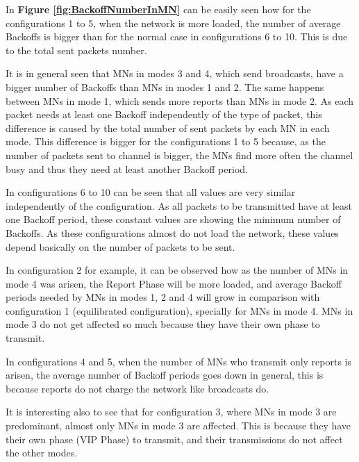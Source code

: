 In \textbf{Figure \ref{fig:BackoffNumberInMN}} can be easily seen how for the configurations 1 to 5, when the network is more loaded, the number of 
average Backoffs is bigger than for the normal case in configurations 6 to 10. This is due to the total sent packets number.

It is in general seen that \acp{MN} in modes 3 and 4, which send broadcasts, have a bigger number of Backoffs than \acp{MN} in modes 1 and 2. The same 
happens between \acp{MN} in mode 1, which sends more reports than \acp{MN} in mode 2. As each packet needs at least one Backoff independently of the type of 
packet, this difference is caused by the total number of sent packets by each \ac{MN} in each mode. This difference is bigger for the configurations 1 
to 5 because, as the number of packets sent to channel is bigger, the \acp{MN} find more often the channel busy and thus they need at least another Backoff
period.

In configurations 6 to 10 can be seen that all values are very similar independently of the configuration. As all packets to be transmitted have at least
one Backoff period, these constant values are showing the minimum number of Backoffs. As these configurations almost do not load the network, these values 
depend basically on the number of packets to be sent.

In configuration 2 for example, it can be observed how as the number of \acp{MN} in mode 4 was arisen, the Report Phase will be more loaded, and average
Backoff periods needed by \acp{MN} in modes 1, 2 and 4 will grow in comparison with configuration 1 (equilibrated configuration), specially for \acp{MN} in
mode 4. \acp{MN} in mode 3 do not get affected so much because they have their own phase to transmit.

In configurations 4 and 5, when the number of \acp{MN} who transmit only reports is arisen, the average number of Backoff periods goes down in general,
this is because reports do not charge the network like broadcasts do.

It is interesting also to see that for configuration 3, where \acp{MN} in mode 3 are predominant, almost only \acp{MN} in mode 3 are affected. This is
because they have their own phase (\ac{VIP} Phase) to transmit, and their transmissions do not affect the other modes.

